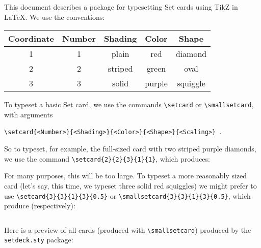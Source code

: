 \documentclass{article}
\begin{document}
\maketitle

This document describes a package for typesetting Set cards using TikZ in LaTeX.  We use the conventions:

\begin{center}
\begin{tabular}{| c | c | c | c | c |}
\hline
Coordinate & Number & Shading & Color & Shape \\
\hline
1 & 1 & plain & red & diamond \\
2 & 2 & striped & green & oval \\
3 & 3 & solid & purple & squiggle \\
\hline
\end{tabular}
\end{center}

To typeset a basic Set card, we use the commands \verb|\setcard| or \verb|\smallsetcard|, with arguments

\verb|\setcard{<Number>}{<Shading>}{<Color>}{<Shape>}{<Scaling>} |.

\vspace{10pt}

So to typeset, for example, the full-sized card with two striped purple diamonds, we use the command \verb|\setcard{2}{2}{3}{1}{1}|, which produces:
\vspace{10pt}
\begin{center}
\end{center}

\vspace{10pt}

For many purposes, this will be too large.  To typeset a more reasonably sized card (let's say, this time, we typeset three solid red squiggles) we might prefer to use \verb|\setcard{3}{3}{1}{3}{0.5}| or \verb|\smallsetcard{3}{3}{1}{3}{0.5}|, which produce (respectively):

\vspace{10pt}
\begin{center}
$\;\;\;\;\;\;\;\;\;\;$
\end{center}

Here is a preview of all cards (produced with \verb|\smallsetcard|) produced by the \verb|setdeck.sty| package:

\vspace{10pt}
\end{document}
